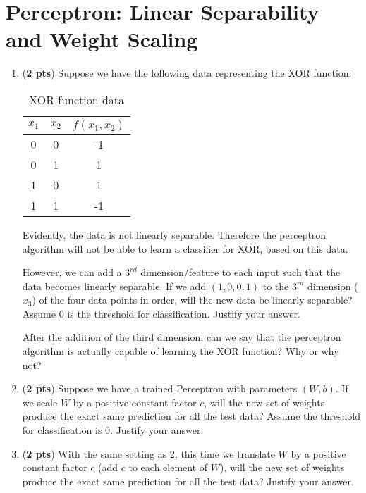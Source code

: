 \documentclass[11pt, letterpaper]{article}
\begin{document}
\section{Perceptron: Linear Separability and Weight Scaling}
\begin{enumerate}[label=(\alph*)]
\item (\textbf{2 pts}) Suppose we have the following data representing the XOR function:

    \begin{table}[H]
    \centering
    \begin{tabular}{|c|c|c|}
        \hline    
         $x_1$ & $x_2$ & $f(x_1,x_2)$ \\
        \hline
        0    & 0 & -1 \\
        0    & 1 & 1 \\
        1    & 0 & 1 \\
        1    & 1 & -1 \\        
        \hline
    \end{tabular}
    \caption{XOR function data}
    \label{tab:my_label}
    \end{table}
    
Evidently, the data is not linearly separable. Therefore the perceptron algorithm will not be able to learn a classifier for XOR, based on this data.

However, we can add a $3^{rd}$ dimension/feature to each input such that the data becomes linearly separable. If we add $(1, 0, 0, 1)$ to the $3^{rd}$ dimension ($x_3$) of the four data points in order, will the new data be linearly separable? Assume 0 is the threshold for classification. Justify your answer.

After the addition of the third dimension, can we say that the perceptron algorithm is actually capable of learning the XOR function? Why or why not?

\bigskip

\item (\textbf{2 pts}) Suppose we have a trained Perceptron with parameters $(W, b)$. If we scale $W$ by a positive constant factor $c$, will the new set of weights produce the exact same prediction for all the test data? Assume the threshold for classification is 0. Justify your answer.

\bigskip

\item (\textbf{2 pts}) With the same setting as 2, this time we translate $W$ by a positive constant factor $c$ (add $c$ to each element of $W$), will the new set of weights produce the exact same prediction for all the test data? Justify your answer.\\
\bigskip

\end{enumerate}
\end{document}
